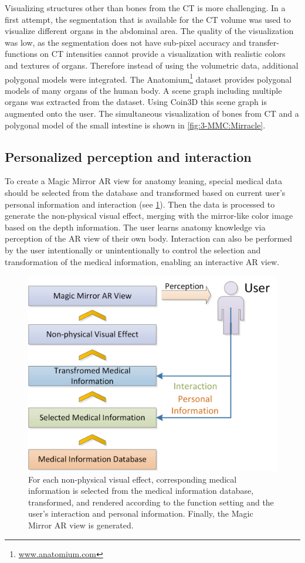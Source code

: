 {Visualizing structures other than bones from the CT is more challenging. In a first attempt, the segmentation that is available for the CT volume was used to visualize different organs in the abdominal area. The quality of the visualization was low, as the segmentation does not have sub-pixel accuracy and transfer-functions on CT intensities cannot provide a visualization with realistic colors and textures of organs. Therefore instead of using the volumetric data, additional polygonal models were integrated. The Anatomium\footnote{\url{www.anatomium.com}} dataset provides polygonal models of many organs of the human body. A scene graph including multiple organs was extracted from the dataset. Using Coin3D this scene graph is augmented onto the user. The simultaneous visualization of bones from CT and a polygonal model of the small intestine is shown in \figurename{\ref{fig:3-MMC:Mirracle}}.
	
\subsection{Personalized perception and interaction} \label{sec:3:MMCInteraction}
To create a Magic Mirror AR view for anatomy leaning, special medical data should be selected from the database and transformed based on current user's personal information and interaction (see \figurename{\ref{fig:3-MMC:MedicalInfoFlow}}). Then the data is processed to generate the non-physical visual effect, merging with the mirror-like color image based on the depth information. The user learns anatomy knowledge via perception of the AR view of their own body. Interaction can also be performed by the user intentionally or unintentionally to control the  selection and transformation of the medical information, enabling an interactive AR view.
\begin{figure}
	\centering
	\includegraphics[width=0.7\linewidth]{figures/3-MMC/MedicalInfoFlow}
	\caption[Medical Information Flow]{For each non-physical visual effect, corresponding medical information is selected from the medical information database, transformed, and rendered according to the function setting and the user's interaction and personal information. Finally, the Magic Mirror AR view is generated.}
	\label{fig:3-MMC:MedicalInfoFlow}
\end{figure}

}
